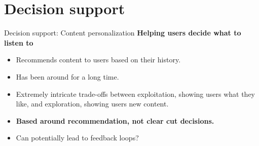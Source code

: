 \documentclass[8pt]{beamer}
\begin{document}
	\section{Decision support}

	\begin{frame}[t]{Decision support: Content personalization}
		\textbf{Helping users decide what to listen to}
		\vspace{0.3cm}
		\begin{center}
		\end{center}
		\vspace{0.3cm}
		\begin{itemize}
			\item Recommends content to users based on their history.
			\item Has been around for a long time.
			\item Extremely intricate trade-offs between exploitation, showing users what they like, and exploration, showing users new content.
			\item \textbf{Based around recommendation, not clear cut decisions.}
			\item Can potentially lead to feedback loops?
		\end{itemize}
	\end{frame}
\end{document}
